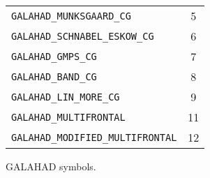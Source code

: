 \documentclass{galahad}
\begin{document}
\begin{figure}[htbf]
\begin{center}
\begin{tabular}{|l|c|}
{\tt GALAHAD\_MUNKSGAARD\_CG}       &  5 \\
{\tt GALAHAD\_SCHNABEL\_ESKOW\_CG}  &  6 \\
{\tt GALAHAD\_GMPS\_CG}             &  7 \\
{\tt GALAHAD\_BAND\_CG}             &  8 \\
{\tt GALAHAD\_LIN\_MORE\_CG}        &  9 \\
{\tt GALAHAD\_MULTIFRONTAL}         &  11 \\
{\tt GALAHAD\_MODIFIED\_MULTIFRONTAL} &  12 \\
\hline
\end{tabular}
\end{center}
\caption{\label{symb1}GALAHAD symbols.}
\end{figure}


\begin{figure}[t]
\begin{center}


\end{center}
\end{figure}
\end{document}
